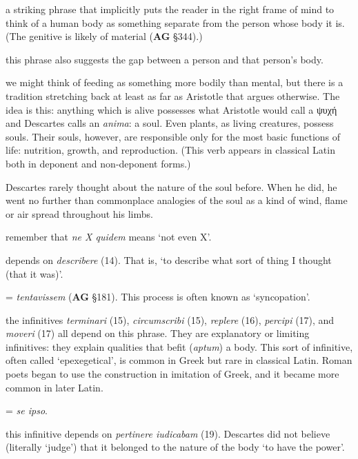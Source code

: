\prenotes

 a striking phrase that implicitly puts the reader in the right frame of mind to think of a human body as something separate from the person whose body it is. (The genitive is likely of material (\textbf{AG} §344).)

 this phrase also suggests the gap between a person and that person's body.

 we might think of feeding as something more bodily than mental, but there is a tradition stretching back at least as far as Aristotle that argues otherwise. The idea is this: anything which is alive possesses what Aristotle would call a ψυχή and Descartes calls an \textit{anima}: a soul. Even plants, as living creatures, possess souls. Their souls, however, are responsible only for the most basic functions of life: nutrition, growth, and reproduction. (This verb appears in classical Latin both in deponent and non-deponent forms.)

 Descartes rarely thought about the nature of the soul before. When he did, he went no further than commonplace analogies of the soul as a kind of wind, flame or air spread throughout his limbs.

 remember that \textit{ne X quidem} means `not even X'.

 depends on \textit{describere} (14). That is, `to describe what sort of thing I thought (that it was)'.

 = \textit{tentavissem} (\textbf{AG} §181). This process is often known as `syncopation'.

 the infinitives \textit{terminari} (15), \textit{circumscribi} (15), \textit{replere} (16), \textit{percipi} (17), and \textit{moveri} (17) all depend on this phrase. They are explanatory or limiting infinitives: they explain qualities that befit (\textit{aptum}) a body. This sort of infinitive, often called `epexegetical', is common in Greek but rare in classical Latin. Roman poets began to use the construction in imitation of Greek, and it became more common in later Latin.

 = \textit{se ipso}.

 this infinitive depends on \textit{pertinere iudicabam} (19). Descartes did not believe (literally `judge') that it belonged to the nature of the body `to have the power'.


